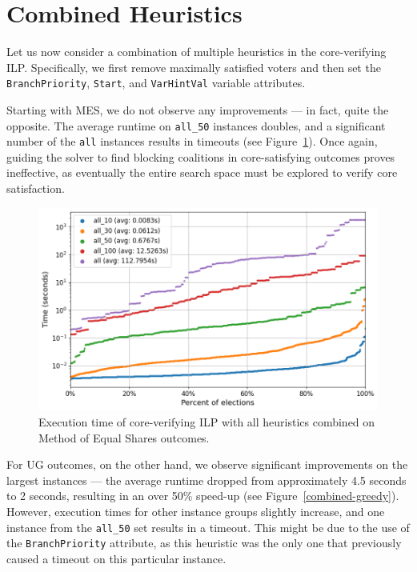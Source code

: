 \documentclass[magisterska,en]{pracamgr}
\newcommand\chartsize{0.94}
\begin{document}
\section{Combined Heuristics}

Let us now consider a combination of multiple heuristics in the core-verifying ILP. Specifically, we first remove maximally satisfied voters and then set the \texttt{BranchPriority}, \texttt{Start}, and \texttt{VarHintVal} variable attributes.

Starting with MES, we do not observe any improvements --- in fact, quite the opposite. The average runtime on \texttt{all\_50} instances doubles, and a significant number of the \texttt{all} instances results in timeouts (see Figure~\ref{combined-mes}). Once again, guiding the solver to find blocking coalitions in core-satisfying outcomes proves ineffective, as eventually the entire search space must be explored to verify core satisfaction.

\begin{figure}[h!]
    \centering
    \includegraphics[width=\chartsize\linewidth]{outputs/Combined/mes.png}
    \caption{Execution time of core-verifying ILP with all heuristics combined on Method of Equal Shares outcomes.}
    \label{combined-mes}
\end{figure}

For UG outcomes, on the other hand, we observe significant improvements on the largest instances --- the average runtime dropped from approximately 4.5 seconds to 2 seconds, resulting in an over 50\% speed-up (see Figure~\ref{combined-greedy}). However, execution times for other instance groups slightly increase, and one instance from the \texttt{all\_50} set results in a timeout. This might be due to the use of the \texttt{BranchPriority} attribute, as this heuristic was the only one that previously caused a timeout on this particular instance.
\end{document}
